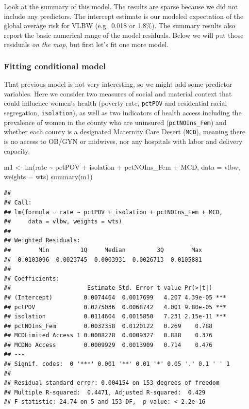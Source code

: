 \documentclass[
]{book}
\newenvironment{Shaded}{\begin{snugshade}}{\end{snugshade}}
\newcommand{\AttributeTok}[1]{\textcolor[rgb]{0.77,0.63,0.00}{#1}}
\newcommand{\FunctionTok}[1]{\textcolor[rgb]{0.00,0.00,0.00}{#1}}
\newcommand{\NormalTok}[1]{#1}
\newcommand{\OtherTok}[1]{\textcolor[rgb]{0.56,0.35,0.01}{#1}}
\newcommand{\SpecialCharTok}[1]{\textcolor[rgb]{0.00,0.00,0.00}{#1}}
\begin{document}
Look at the summary of this model. The results are sparse because we did not include any predictors. The intercept estimate is our modeled expectation of the global average risk for VLBW (e.g.~0.018 or 1.8\%). The summary results also report the basic numerical range of the model residuals. Below we will put those residuals \emph{on the map}, but first let's fit one more model.

\hypertarget{fitting-conditional-model}{%
\subsubsection{Fitting conditional model}\label{fitting-conditional-model}}

That previous model is not very interesting, so we might add some predictor variables. Here we consider two measures of social and material context that could influence women's health (poverty rate, \texttt{pctPOV} and residential racial segregation, \texttt{isolation}), as well as two indicators of health access including the prevalence of women in the county who are uninsured (\texttt{pctNOIns\_Fem}) and whether each county is a designated Maternity Care Desert (\texttt{MCD}), meaning there is no access to OB/GYN or midwives, nor any hospitals with labor and delivery capacity.

\begin{Shaded}
\begin{Highlighting}[]
\NormalTok{m1 }\OtherTok{\textless{}{-}} \FunctionTok{lm}\NormalTok{(rate }\SpecialCharTok{\textasciitilde{}}\NormalTok{ pctPOV }\SpecialCharTok{+}\NormalTok{ isolation }\SpecialCharTok{+}\NormalTok{ pctNOIns\_Fem }\SpecialCharTok{+}\NormalTok{ MCD,}
         \AttributeTok{data =}\NormalTok{ vlbw,}
         \AttributeTok{weights =}\NormalTok{ wts)}
\FunctionTok{summary}\NormalTok{(m1)}
\end{Highlighting}
\end{Shaded}

\begin{verbatim}
## 
## Call:
## lm(formula = rate ~ pctPOV + isolation + pctNOIns_Fem + MCD, 
##     data = vlbw, weights = wts)
## 
## Weighted Residuals:
##        Min         1Q     Median         3Q        Max 
## -0.0103096 -0.0023745  0.0003931  0.0026713  0.0105881 
## 
## Coefficients:
##                      Estimate Std. Error t value Pr(>|t|)    
## (Intercept)         0.0074464  0.0017699   4.207 4.39e-05 ***
## pctPOV              0.0275036  0.0068742   4.001 9.80e-05 ***
## isolation           0.0114604  0.0015850   7.231 2.15e-11 ***
## pctNOIns_Fem        0.0032358  0.0120122   0.269    0.788    
## MCDLimited Access 1 0.0008278  0.0009327   0.888    0.376    
## MCDNo Access        0.0009929  0.0013909   0.714    0.476    
## ---
## Signif. codes:  0 '***' 0.001 '**' 0.01 '*' 0.05 '.' 0.1 ' ' 1
## 
## Residual standard error: 0.004154 on 153 degrees of freedom
## Multiple R-squared:  0.4471, Adjusted R-squared:  0.429 
## F-statistic: 24.74 on 5 and 153 DF,  p-value: < 2.2e-16
\end{verbatim}
\end{document}
